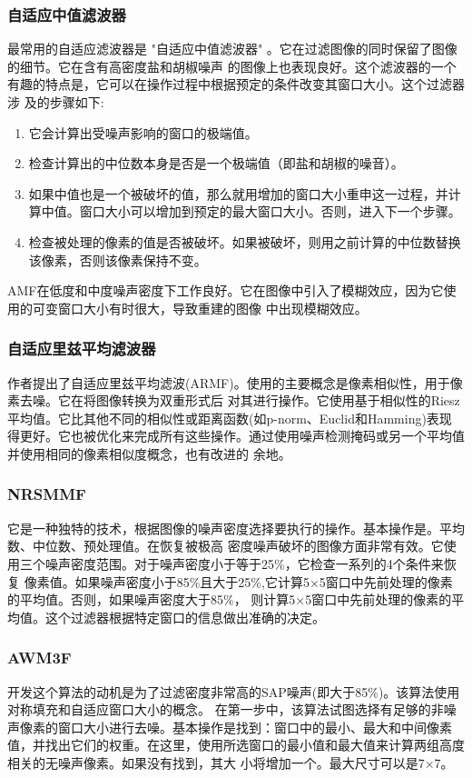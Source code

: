 \documentclass[12pt]{article} %
\begin{document}
\subsubsection{自适应中值滤波器}
最常用的自适应滤波器是 "自适应中值滤波器" \cite{ref16}。它在过滤图像的同时保留了图像的细节。它在含有高密度盐和胡椒噪声
的图像上也表现良好。这个滤波器的一个有趣的特点是，它可以在操作过程中根据预定的条件改变其窗口大小。这个过滤器涉
及的步骤如下:
\begin{enumerate}
    \item 它会计算出受噪声影响的窗口的极端值。
    \item 检查计算出的中位数本身是否是一个极端值（即盐和胡椒的噪音）。
    \item 如果中值也是一个被破坏的值，那么就用增加的窗口大小重申这一过程，并计算中值。窗口大小可以增加到预定的最大窗口大小。否则，进入下一个步骤。
    \item 检查被处理的像素的值是否被破坏。如果被破坏，则用之前计算的中位数替换该像素，否则该像素保持不变。
\end{enumerate}
AMF在低度和中度噪声密度下工作良好。它在图像中引入了模糊效应，因为它使用的可变窗口大小有时很大，导致重建的图像
中出现模糊效应。

\subsubsection{自适应里兹平均滤波器}
作者提出了自适应里兹平均滤波(ARMF\cite{ref8})。使用的主要概念是像素相似性，用于像素去噪。它在将图像转换为双重形式后
对其进行操作。它使用基于相似性的Riesz平均值。它比其他不同的相似性或距离函数(如p-norm、Euclid和Hamming)表现
得更好。它也被优化来完成所有这些操作。通过使用噪声检测掩码或另一个平均值并使用相同的像素相似度概念，也有改进的
余地。

\subsubsection{NRSMMF}
它\cite{ref25}是一种独特的技术，根据图像的噪声密度选择要执行的操作。基本操作是。平均数、中位数、预处理值。在恢复被极高
密度噪声破坏的图像方面非常有效。它使用三个噪声密度范围。对于噪声密度小于等于25\%，它检查一系列的4个条件来恢复
像素值。如果噪声密度小于85\%且大于25\%,它计算5×5窗口中先前处理的像素的平均值。否则，如果噪声密度大于85\%，
则计算5×5窗口中先前处理的像素的平均值。这个过滤器根据特定窗口的信息做出准确的决定。

\subsubsection{AWM3F}
开发这个\cite{ref23}算法的动机是为了过滤密度非常高的SAP噪声(即大于85\%)。该算法使用对称填充和自适应窗口大小的概念。
在第一步中，该算法试图选择有足够的非噪声像素的窗口大小进行去噪。基本操作是找到：窗口中的最小、最大和中间像素
值，并找出它们的权重。在这里，使用所选窗口的最小值和最大值来计算两组高度相关的无噪声像素。如果没有找到，其大
小将增加一个。最大尺寸可以是7×7。
\end{document}
